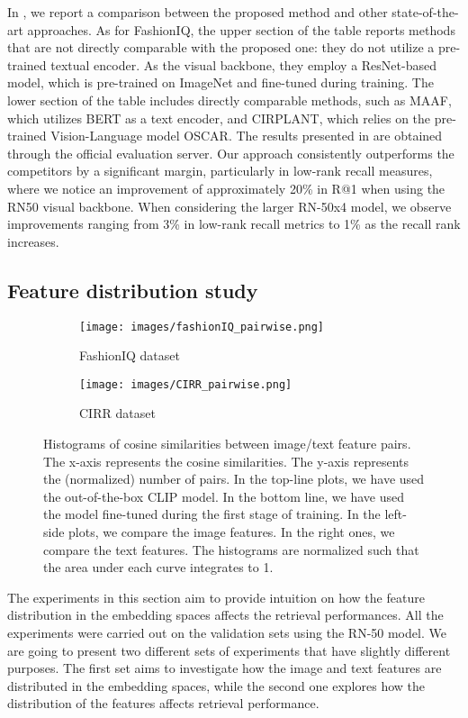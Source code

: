 \documentclass[acmlarge]{acmart}
\begin{document}
In , we report a comparison between the proposed method and other state-of-the-art approaches. As for FashionIQ, the upper section of the table reports methods that are not directly comparable with the proposed one: they do not utilize a pre-trained textual encoder. As the visual backbone, they employ a ResNet-based model, which is pre-trained on ImageNet and fine-tuned during training.
The lower section of the table includes directly comparable methods, such as MAAF, which utilizes BERT as a text encoder, and CIRPLANT, which relies on the pre-trained Vision-Language model OSCAR. The results presented in  are obtained through the official evaluation server. Our approach consistently outperforms the competitors by a significant margin, particularly in low-rank recall measures, where we notice an improvement of approximately 20\% in R@1 when using the RN50 visual backbone. When considering the larger RN-50x4 model, we observe improvements ranging from 3\% in low-rank recall metrics to 1\% as the recall rank increases.






\subsection{Feature distribution study}\label{sec:feat_study}
\begin{figure}[t]
    \centering
    \begin{subfigure}{0.48\linewidth}
    \texttt{[image: images/fashionIQ\_pairwise.png]}
    \caption{FashionIQ dataset}
    \label{fig:pairwise-fiq}
    \end{subfigure}\hfill
 \begin{subfigure}{0.48\linewidth}
    \texttt{[image: images/CIRR\_pairwise.png]}
    \caption{CIRR dataset}
    \label{fig:pairwise-cirr}
    \end{subfigure}
    \vspace{-1.8ex}
    \caption{Histograms of cosine similarities between image/text feature pairs. The x-axis represents the cosine similarities. The y-axis represents the (normalized) number of pairs.
    In the top-line plots, we have used the out-of-the-box CLIP model. In the bottom line, we have used the model fine-tuned during the first stage of training. In the left-side plots, we compare the image features. In the right ones, we compare the text features. The histograms are normalized such that the area under each curve integrates to 1.}
    \label{fig:pairwise-similarities}
    \vspace{-2.5ex}
\end{figure}
The experiments in this section aim to provide intuition on how the feature distribution in the embedding spaces affects the retrieval performances. All the experiments were carried out on the validation sets using the RN-50 model.
We are going to present two different sets of experiments that have slightly different purposes. The first set aims to investigate how the image and text features are distributed in the embedding spaces, while the second one explores how the distribution of the features affects retrieval performance.
\end{document}
